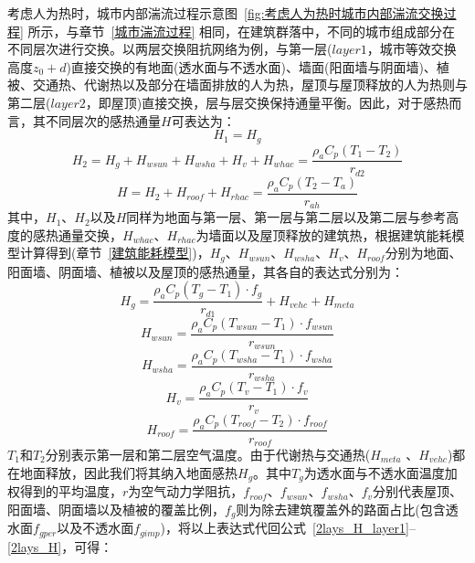 考虑人为热时，城市内部湍流过程示意图~\ref{fig:考虑人为热时城市内部湍流交换过程} 所示，与章节~\ref{城市湍流过程} 相同，在建筑群落中，不同的城市组成部分在不同层次进行交换。以两层交换阻抗网络为例，与第一层($layer1$，城市等效交换高度$z_0+d$)直接交换的有地面(透水面与不透水面)、墙面(阳面墙与阴面墙)、植被、交通热、代谢热以及部分在墙面排放的人为热，屋顶与屋顶释放的人为热则与第二层($layer2$，即屋顶)直接交换，层与层交换保持通量平衡。因此，对于感热而言，其不同层次的感热通量$H$可表达为：
\begin{equation}\label{2lays_H_layer1}
    H_{1} = H_{g}
\end{equation}
%
\begin{equation}\label{2lays_H_layer2}
    H_{2} = H_{g} + H_{wsun} + H_{wsha} + H_{v} + H_{whac} = \frac{\rho _a C_p \left( T_{1} - T_{2} \right)}{r_{d2}}
\end{equation}
%
\begin{equation}\label{2lays_H}
    H = H_{2} + H_{roof} + H_{rhac} = \frac{\rho _a C_p \left( T_{2} - T_a \right)}{r_{ah}}
\end{equation}
其中，$H_1$、$H_2$以及$H$同样为地面与第一层、第一层与第二层以及第二层与参考高度的感热通量交换，$H_{whac}$、$H_{rhac}$为墙面以及屋顶释放的建筑热，根据建筑能耗模型计算得到(章节~\ref{建筑能耗模型})，$H_{g}$、$H_{wsun}$、$H_{wsha}$、$H_{v}$、$H_{roof}$分别为地面、阳面墙、阴面墙、植被以及屋顶的感热通量，其各自的表达式分别为：
\begin{equation}\label{urban_Hg}
    H_{g} = \frac{\rho _a C_p \left( T_{g} - T_{1} \right) \cdot f_{g}}{r_{d1}} + H_{vehc} + H_{meta}
\end{equation}
%
\begin{equation}
    H_{wsun} = \frac{\rho  _a C_p \left( T_{wsun} - T_{1} \right) \cdot f_{wsun}}{r_{wsun}}
\end{equation}
%
\begin{equation}
    H_{wsha} = \frac{\rho _a C_p \left( T_{wsha} - T_{1} \right) \cdot f_{wsha}}{r_{wsha}}
\end{equation}
%
\begin{equation}
    H_{v} = \frac{\rho _a C_p \left( T_{v} - T_{1} \right) \cdot f_v}{r_{v}}
\end{equation}
%
\begin{equation}\label{urban_Hroof}
    H_{roof} = \frac{\rho _a C_p \left( T_{roof} - T_{2} \right) \cdot f_{roof}}{r_{roof}}
\end{equation}
$T_1$和$T_2$分别表示第一层和第二层空气温度。由于代谢热与交通热($H_{meta}$ 、$H_{vehc}$)都在地面释放，因此我们将其纳入地面感热$H_{g}$。其中$T_{g}$为透水面与不透水面温度加权得到的平均温度，$r$为空气动力学阻抗，\allowbreak $f_{roof}$、\allowbreak $f_{wsun}$、\allowbreak $f_{wsha}$、\allowbreak $f_v$分别代表屋顶、阳面墙、阴面墙以及植被的覆盖比例，$f_{g}$则为除去建筑覆盖外的路面占比(包含透水面$f_{gper}$以及不透水面$f_{gimp}$)，将以上表达式代回公式~\eqref{2lays_H_layer1}--\eqref{2lays_H}，可得：
